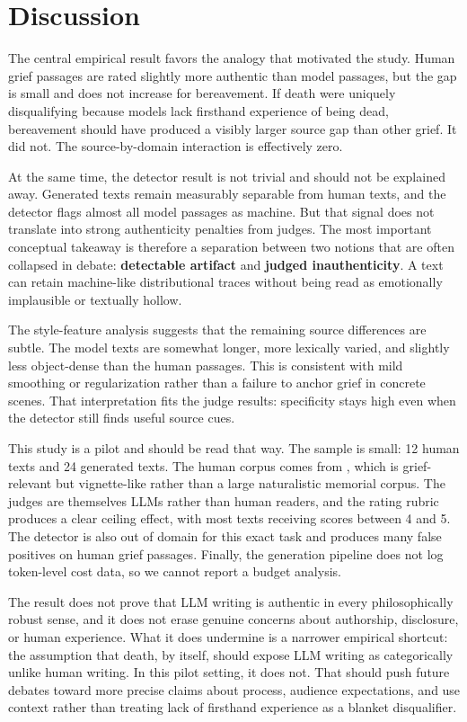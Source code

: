 \section{Discussion}
\label{sec:discussion}

The central empirical result favors the analogy that motivated the study. Human grief passages are rated slightly more authentic than model passages, but the gap is small and does not increase for bereavement. If death were uniquely disqualifying because models lack firsthand experience of being dead, bereavement should have produced a visibly larger source gap than other grief. It did not. The source-by-domain interaction is effectively zero.

At the same time, the detector result is not trivial and should not be explained away. Generated texts remain measurably separable from human texts, and the detector flags almost all model passages as machine. But that signal does not translate into strong authenticity penalties from judges. The most important conceptual takeaway is therefore a separation between two notions that are often collapsed in debate: {\bf detectable artifact} and {\bf judged inauthenticity}. A text can retain machine-like distributional traces without being read as emotionally implausible or textually hollow.

The style-feature analysis suggests that the remaining source differences are subtle. The model texts are somewhat longer, more lexically varied, and slightly less object-dense than the human passages. This is consistent with mild smoothing or regularization rather than a failure to anchor grief in concrete scenes. That interpretation fits the judge results: specificity stays high even when the detector still finds useful source cues.

This study is a pilot and should be read that way. The sample is small: 12 human texts and 24 generated texts. The human corpus comes from \aipsy, which is grief-relevant but vignette-like rather than a large naturalistic memorial corpus. The judges are themselves LLMs rather than human readers, and the rating rubric produces a clear ceiling effect, with most texts receiving scores between 4 and 5. The \mage detector is also out of domain for this exact task and produces many false positives on human grief passages. Finally, the generation pipeline does not log token-level cost data, so we cannot report a budget analysis.

The result does not prove that LLM writing is authentic in every philosophically robust sense, and it does not erase genuine concerns about authorship, disclosure, or human experience. What it does undermine is a narrower empirical shortcut: the assumption that death, by itself, should expose LLM writing as categorically unlike human writing. In this pilot setting, it does not. That should push future debates toward more precise claims about process, audience expectations, and use context rather than treating lack of firsthand experience as a blanket disqualifier.

